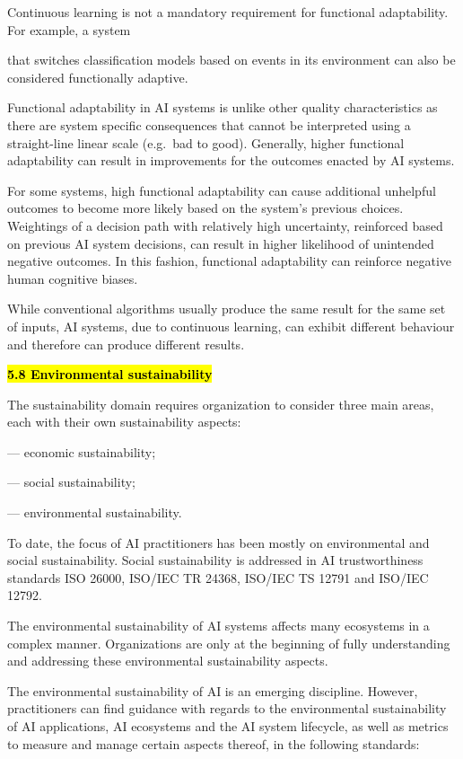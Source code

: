 \documentclass[
  letterpaper,
  DIV=11,
  numbers=noendperiod,
  oneside]{scrreprt}
\begin{document}
\begin{tcolorbox}
Continuous learning is not a mandatory requirement for functional
adaptability. For example, a system

that switches classification models based on events in its environment
can also be considered functionally adaptive.

Functional adaptability in AI systems is unlike other quality
characteristics as there are system specific consequences that cannot be
interpreted using a straight-line linear scale (e.g.~bad to good).
Generally, higher functional adaptability can result in improvements for
the outcomes enacted by AI systems.

For some systems, high functional adaptability can cause additional
unhelpful outcomes to become more likely based on the system's previous
choices. Weightings of a decision path with relatively high uncertainty,
reinforced based on previous AI system decisions, can result in higher
likelihood of unintended negative outcomes. In this fashion, functional
adaptability can reinforce negative human cognitive biases.

While conventional algorithms usually produce the same result for the
same set of inputs, AI systems, due to continuous learning, can exhibit
different behaviour and therefore can produce different results.

\textbf{\hl{5.8 Environmental sustainability}}

The sustainability domain requires organization to consider three main
areas, each with their own sustainability aspects:

--- economic sustainability;

--- social sustainability;

--- environmental sustainability.

To date, the focus of AI practitioners has been mostly on environmental
and social sustainability. Social sustainability is addressed in AI
trustworthiness standards ISO 26000, ISO/IEC TR 24368, ISO/IEC TS 12791
and ISO/IEC 12792.

The environmental sustainability of AI systems affects many ecosystems
in a complex manner. Organizations are only at the beginning of fully
understanding and addressing these environmental sustainability aspects.

The environmental sustainability of AI is an emerging discipline.
However, practitioners can find guidance with regards to the
environmental sustainability of AI applications, AI ecosystems and the
AI system lifecycle, as well as metrics to measure and manage certain
aspects thereof, in the following standards:


\end{tcolorbox}
\end{document}
